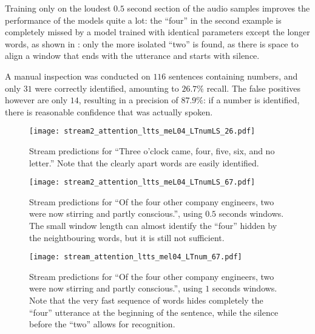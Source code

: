 Training only on the loudest $0.5$ second section of the audio samples improves
the performance of the models quite a lot: the ``four'' in the second example
is completely missed by a model trained with identical parameters except the
longer words, as shown in : only
the more isolated ``two'' is found, as there is space to align a window that
ends with the utterance and starts with silence.

A manual inspection was conducted on $116$ sentences containing numbers, and
only $31$ were correctly identified, amounting to $26.7\%$ recall.
The false positives however are only $14$, resulting in a precision of
$87.9\%$: if a number is identified, there is reasonable confidence that was
actually spoken.

\begin{figure}[h!]
    \centering
    \texttt{[image: stream2\_attention\_ltts\_meL04\_LTnumLS\_26.pdf]}
    \caption{Stream predictions for ``Three o'clock came, four, five, six, and no letter.''
        Note that the clearly apart words are easily identified.
    }%
    \label{fig:stream_attention_ltts_meL04_LTnumLS_26}
\end{figure}

\begin{figure}[h!]
    \centering
    \texttt{[image: stream2\_attention\_ltts\_meL04\_LTnumLS\_67.pdf]}
    \caption{Stream predictions for
        ``Of the four other company engineers, two were now stirring and partly
        conscious.'', using $0.5$ seconds windows. The small window length
        can almost identify the ``four'' hidden by the neightbouring
        words, but it is still not sufficient.
    }%
    \label{fig:stream_attention_ltts_meL04_LTnumLS_67}
\end{figure}

\begin{figure}[h!]
    \centering
    \texttt{[image: stream\_attention\_ltts\_mel04\_LTnum\_67.pdf]}
    \caption{Stream predictions for
        ``Of the four other company engineers, two were now stirring and partly conscious.'',
        using $1$ seconds windows.
        Note that the very fast sequence of words hides completely the ``four''
        utterance at the beginning of the sentence, while the silence before
        the ``two'' allows for recognition.
    }%
    \label{fig:stream_attention_ltts_mel04_LTnum_67}
\end{figure}

